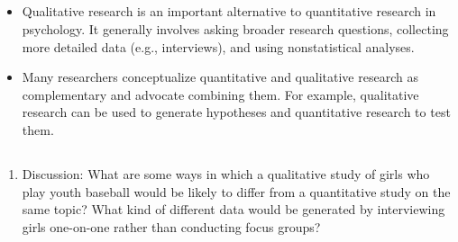 \subsection{}

\begin{fullwidth}

\begin{itemize}


\item Qualitative research is an important alternative to quantitative research in psychology. It generally involves asking broader research questions, collecting more detailed data (e.g., interviews), and using nonstatistical analyses.

\item Many researchers conceptualize quantitative and qualitative research as complementary and advocate combining them. For example, qualitative research can be used to generate hypotheses and quantitative research to test them.


\end{itemize}

\end{fullwidth}



\subsection{}

\begin{fullwidth}

\begin{enumerate}

\item  Discussion: What are some ways in which a qualitative study of girls who play youth baseball would be likely to differ from a quantitative study on the same topic? What kind of different data would be generated by interviewing girls one-on-one rather than conducting focus groups?

\end{enumerate}

\end{fullwidth}  

